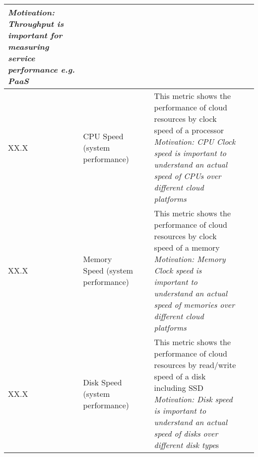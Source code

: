 \begin{table*}[p]
\begin{scriptsize}
\begin{center}
\begin{tabular}{lp{}p{}p{}p{}}
{\it Motivation: Throughput is important for measuring service performance e.g. PaaS} &
~ \\
\hline
XX.X &
CPU Speed (system performance)&
~&
This metric shows the performance of cloud resources by clock speed of a processor 
{\it Motivation: CPU Clock speed is important to understand an actual speed of CPUs over different cloud platforms} &
~ \\
\hline
XX.X &
Memory Speed (system performance)&
~&
This metric shows the performance of cloud resources by clock speed of a memory 
{\it Motivation: Memory Clock speed is important to understand an actual speed of memories over different cloud platforms} &
~ \\
\hline
XX.X &
Disk Speed (system performance)&
~&
This metric shows the performance of cloud resources by read/write speed of a disk including SSD 
{\it Motivation: Disk speed is important to understand an actual speed of disks over different disk type}s&
~ \\
\hline
\end{tabular}
\end{center}
\end{scriptsize}
\end{table*}

